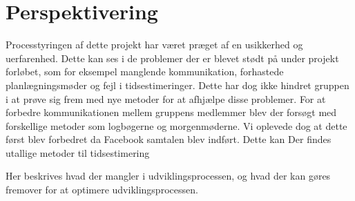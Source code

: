 \chapter{Perspektivering}
Processtyringen af dette projekt har været præget af en usikkerhed og uerfarenhed. Dette kan ses i de problemer der er blevet stødt på under projekt forløbet, som for eksempel manglende kommunikation, forhastede planlægningsmøder og fejl i tidsestimeringer. Dette har dog ikke hindret gruppen i at prøve sig frem med nye metoder for at afhjælpe disse problemer. 
For at forbedre kommunikationen mellem gruppens medlemmer blev der forsøgt med forskellige metoder som logbøgerne og morgenmøderne. Vi oplevede dog at dette først blev forbedret da Facebook samtalen blev indført. 
Dette kan 
Der findes utallige metoder til tidsestimering 

Her beskrives hvad der mangler i udviklingsprocessen, og hvad der kan gøres
fremover for at optimere udviklingsprocessen. 
